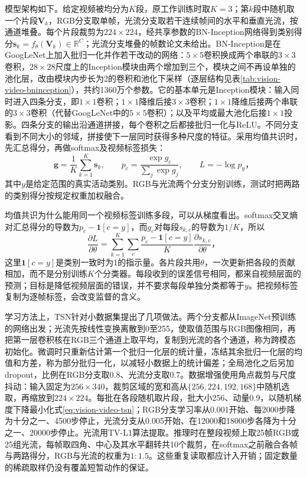 模型架构如下。给定视频被均分为$K$段，原工作训练时取$K=3$；第$k$段中随机取一个片段$\bm{V}_k$，RGB分支取单帧，光流分支取若干连续帧间的水平和垂直光流，按通道堆叠。每个片段裁剪为$224\times224$，经共享参数的BN-Inception网络得到类别得分$\bm{s}_k=f_\theta(\bm{V}_k)\in\mathbb{R}^C$；光流分支堆叠的帧数论文未给出。BN-Inception是在GoogLeNet上加入批归一化并作若干改动的网络：$5\times5$卷积换成两个串联的$3\times3$卷积，$28\times28$尺度上的Inception模块由两个增加到三个，模块之间不再设单独的池化层，改由模块内步长为2的卷积和池化下采样（逐层结构见表\ref{tab:vision-video-bninception}），共约1360万个参数。它的基本单元是Inception模块：输入同时进入四条分支，即$1\times1$卷积；$1\times1$降维后接$3\times3$卷积；$1\times1$降维后接两个串联的$3\times3$卷积（代替GoogLeNet中的$5\times5$卷积）；以及平均或最大池化后接$1\times1$投影。四条分支的输出沿通道拼接，每个卷积之后都接批归一化与ReLU。不同分支看到不同大小的邻域，拼接使下一层同时获得多种尺度的特征。采用均值共识时，先汇总得分，再做softmax及视频标签损失：
\begin{equation}
  \bm{g}=\frac{1}{K}\sum_{k=1}^{K}\bm{s}_k,\qquad
  p_c=\frac{\exp g_c}{\sum_j\exp g_j},\qquad
  L=-\log p_y\text{，}
  \label{eq:vision-video-tsn}
\end{equation}
其中$y$是给定范围的真实活动类别。RGB与光流两个分支分别训练，测试时把两路的类别得分按规定权重加权融合。

均值共识为什么能用同一个视频标签训练多段，可以从梯度看出。softmax交叉熵对汇总得分的导数为$p_c-\bm{1}[c=y]$，而$g_c$对每段$s_{k,c}$的导数为$1/K$，所以
\[
  \frac{\partial L}{\partial\theta}
  =\sum_{k=1}^{K}\sum_c
    \frac{p_c-\bm{1}[c=y]}{K}
    \frac{\partial s_{k,c}}{\partial\theta}\text{，}
\]
这里$\bm{1}[c=y]$是类别一致时为1的指示量。各片段共用$\theta$，一次更新把各段的贡献相加，而不是分别训练$K$个分类器。每段收到的误差信号相同，都来自视频层面的预测；目标是降低视频层面的错误，并不要求每段单独分类都等于$y$。把视频标签复制为逐帧标签，会改变监督的含义。

学习方法上，TSN针对小数据集提出了几项做法。两个分支都从ImageNet预训练的网络出发；光流先按线性变换离散到0至255，使取值范围与RGB图像相同，再把第一层卷积核在RGB三个通道上取平均，复制到光流的各个通道，称为跨模态初始化。微调时只重新估计第一个批归一化层的统计量，冻结其余批归一化层的均值和方差，称为部分批归一化，以减轻小数据上的统计偏差；全局池化之后另加dropout，比例在RGB分支取0.8、光流分支取0.7。数据增强使用角点裁剪与尺度抖动：输入固定为$256\times340$，裁剪区域的宽和高从$\{256,224,192,168\}$中随机选取，再缩放到$224\times224$。每批在各段随机取片段，批大小256、动量0.9，以随机梯度下降最小化式\eqref{eq:vision-video-tsn}；RGB分支学习率从0.001开始、每2000步降为十分之一、4500步停止，光流分支从0.005开始、在12000和18000步各降为十分之一、20000步停止。光流用TV-L1算法提取。推理时在整段视频上取25帧RGB或25组光流，每帧取四角、中心及其水平翻转共10个裁剪，在softmax之前融合各帧与两路得分，RGB与光流的权重为$1:1.5$。这些重复读取都应计入开销；固定数量的稀疏取样仍没有覆盖短暂动作的保证。

